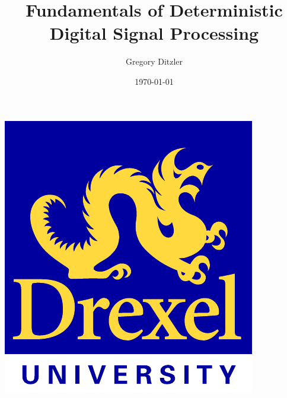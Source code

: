 \documentclass[mathserif,9pt]{beamer}
\begin{document}
\title[\url{gregory.ditzler@gmail.com}]{\bf Fundamentals of Deterministic Digital Signal Processing}
\author[Deterministic Digital Signal Processing]{Gregory Ditzler}
\date[\today]{\scriptsize \today}




\begin{frame}
  \titlepage\vfill
  \vspace{-2em}
  \begin{center}
    \includegraphics[scale=.3,keepaspectratio]{drexel-logo.pdf} 
  \end{center}
\end{frame}
\end{document}
